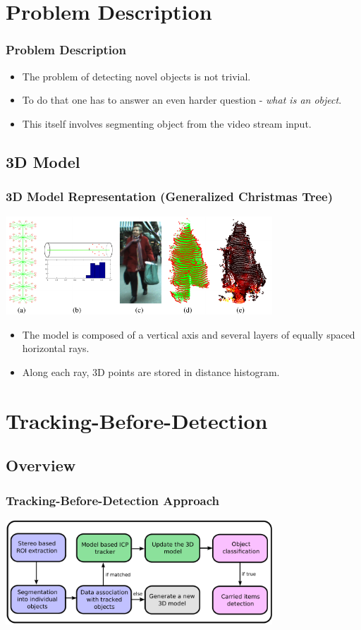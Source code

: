 \documentclass{beamer}
\begin{document}
\section{Problem Description}
\begin{frame}
\frametitle{Problem Description} 
\begin{itemize}
  \item The problem of detecting novel objects is not trivial.
  \item To do that one has to answer an even harder question - \emph{what is an object}.
  \item This itself involves segmenting object from the video stream input.
\end{itemize}
\end{frame}



\subsection{3D Model}
\begin{frame}
\frametitle{3D Model Representation (Generalized Christmas Tree)} 

\begin{center}
  \includegraphics[width=10cm]{3D_model.pdf}
\end{center}
\begin{itemize}
  \item The model is composed of a vertical axis and several layers of equally spaced horizontal rays.
  \item  Along each ray, 3D points are stored in distance histogram.
\end{itemize}
\end{frame}

\section{Tracking-Before-Detection}
\subsection{Overview}
\begin{frame}
\frametitle{Tracking-Before-Detection Approach} 
\begin{center}
  	\includegraphics[width=10cm]{overview.pdf}
	\end{center}
\end{frame}
\end{document}
